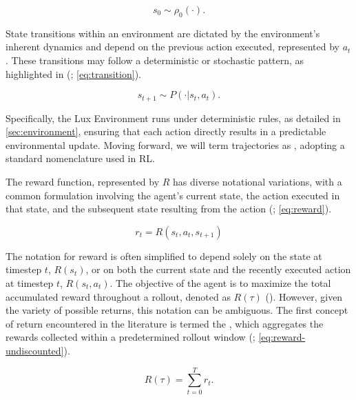 \begin{equation}
    s_0 \sim \rho_0(\cdot).
    \label{eq:start-state-distrib}
\end{equation}

\noindent State transitions within an environment are dictated by the environment's inherent dynamics and depend on the previous action executed, represented by $a_t$. These transitions may follow a deterministic or stochastic pattern, as highlighted in (\textcolor{deepblue}{\cite{Sutton1998}; \autoref{eq:transition}}). 

\begin{equation}
    s_{t+1} \sim P(\cdot | s_t, a_t).
    \label{eq:transition}
\end{equation}

\noindent Specifically, the Lux Environment runs under deterministic rules, as detailed in \autoref{sec:environment}, ensuring that each action directly results in a predictable environmental update. Moving forward, we will term trajectories as , adopting a standard nomenclature used in RL.

\bigskip

\noindent The reward function, represented by $R$ has diverse notational variations, with a common formulation involving the agent's current state, the action executed in that state, and the subsequent state resulting from the action (\textcolor{deepblue}{\cite{Sutton1998}; \autoref{eq:reward}}).

\begin{equation}
    r_t = R(s_t, a_t, s_{t+1})
    \label{eq:reward}
\end{equation}

\noindent The notation for reward is often simplified to depend solely on the state at timestep $t$, $R(s_t)$, or on both the current state and the recently executed action at timestep $t$, $R(s_t, a_t)$. The objective of the agent is to maximize the total accumulated reward throughout a rollout, denoted as $R(\tau)$ (\textcolor{deepblue}{\cite{Sutton1998}}). However, given the variety of possible returns, this notation can be ambiguous. The first concept of return encountered in the literature is termed the , which aggregates the rewards collected within a predetermined rollout window (\textcolor{deepblue}{\cite{Sutton1998}; \autoref{eq:reward-undiscounted}}).

\begin{equation}
    R(\tau) = \sum_{t=0}^{T} r_t.
    \label{eq:reward-undiscounted}
\end{equation}

